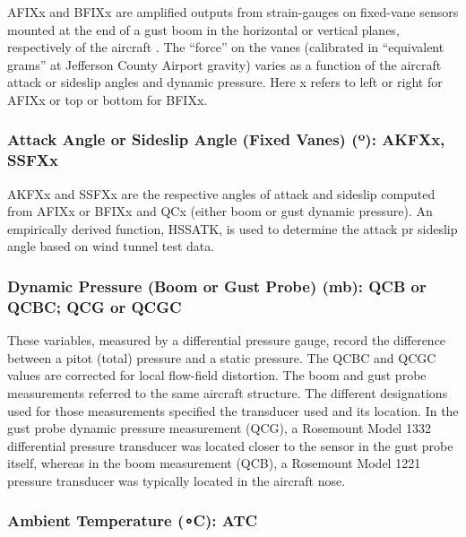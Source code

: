 \documentclass[
  english,
]{book}
\begin{document}
AFIXx and BFIXx are amplified outputs from strain-gauges on fixed-vane sensors mounted at the end of a gust boom in the horizontal or vertical planes, respectively of the aircraft . The ``force'' on the vanes (calibrated in ``equivalent grams'' at Jefferson County Airport gravity) varies as a function of the aircraft attack or sideslip angles and dynamic pressure. Here x refers to left or right for AFIXx or top or bottom for BFIXx.

\hypertarget{akfxx}{%
\subsubsection*{\texorpdfstring{Attack Angle or Sideslip Angle (Fixed Vanes) ({º}): AKFXx, SSFXx}{Attack Angle or Sideslip Angle (Fixed Vanes) (º): AKFXx, SSFXx}}\label{akfxx}}

AKFXx and SSFXx are the respective angles of attack and sideslip computed from AFIXx or BFIXx and QCx (either boom or gust dynamic pressure). An empirically derived function, HSSATK, is used to determine the attack pr sideslip angle based on wind tunnel test data.

\hypertarget{qcb}{%
\subsubsection*{Dynamic Pressure (Boom or Gust Probe) (mb): QCB or QCBC; QCG or QCGC}\label{qcb}}

These variables, measured by a differential pressure gauge, record the difference between a pitot (total) pressure and a static pressure. The QCBC and QCGC values are corrected for local flow-field distortion. The boom and gust probe measurements referred to the same aircraft structure. The different designations used for those measurements specified the transducer used and its location. In the gust probe dynamic pressure measurement (QCG), a Rosemount Model 1332 differential pressure transducer was located closer to the sensor in the gust probe itself, whereas in the boom measurement (QCB), a Rosemount Model 1221 pressure transducer was typically located in the aircraft nose.

\hypertarget{atc}{%
\subsubsection*{\texorpdfstring{Ambient Temperature ({∘C}): ATC}{Ambient Temperature (∘C): ATC}}\label{atc}}
\end{document}

